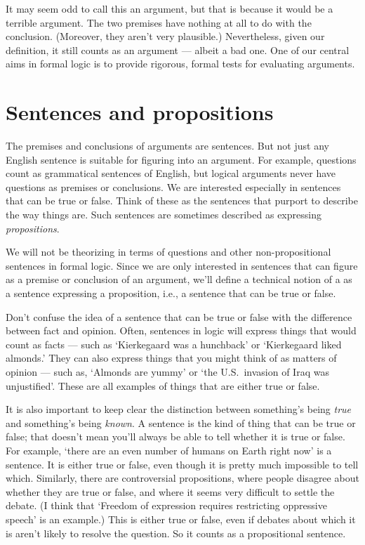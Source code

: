 It may seem odd to call this an argument, but that is because it would be a {terrible} argument. The two premises have nothing at all to do with the conclusion. (Moreover, they aren't very plausible.) Nevertheless, given our definition, it still counts as an argument --- albeit a bad one. One of our central aims in formal logic is to provide rigorous, formal tests for evaluating arguments.


\section{Sentences and propositions}
\label{intro.sentences}

The premises and conclusions of arguments are sentences. But not just any English sentence is suitable for figuring into an argument. For example, questions count as grammatical sentences of English, but logical arguments never have questions as premises or conclusions. We are interested especially in sentences that can be true or false. Think of these as the sentences that purport to describe the way things are. Such sentences are sometimes described as expressing \emph{propositions}.

We will not be theorizing in terms of questions and other non-propositional sentences in formal logic. Since we are only interested in sentences that can figure as a premise or conclusion of an argument, we'll define a technical notion of a  as a sentence expressing a proposition, i.e., a sentence that can be true or false.

Don't confuse the idea of a sentence that can be true or false with the difference between fact and opinion. Often, sentences in logic will express things that would count as facts --- such as `Kierkegaard was a hunchback' or `Kierkegaard liked almonds.' They can also express things that you might think of as matters of opinion --- such as, `Almonds are yummy' or `the U.S.\ invasion of Iraq was unjustified'. These are all examples of things that are either true or false.

It is also important to keep clear the distinction between something's being \emph{true} and something's being \emph{known}. A sentence is the kind of thing that can be true or false; that doesn't mean you'll always be able to tell whether it is true or false. For example, `there are an even number of humans on Earth right now' is a sentence. It is either true or false, even though it is pretty much impossible to tell which. Similarly, there are controversial propositions, where people disagree about whether they are true or false, and where it seems very difficult to settle the debate. (I think that `Freedom of expression requires restricting oppressive speech' is an example.) This is either true or false, even if debates about which it is aren't likely to resolve the question. So it counts as a propositional sentence.

